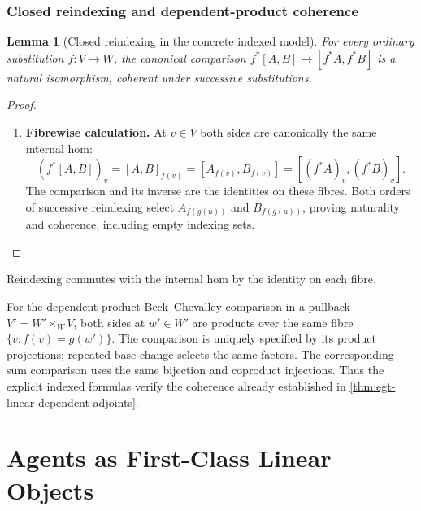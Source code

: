 \documentclass[11pt,a4paper]{article}
\numberwithin{equation}{section}
\newtheorem{lemma}[theorem]{Lemma}
\theoremstyle{definition}
\theoremstyle{remark}
\theoremstyle{plain}
\begin{document}
\subsubsection{Closed reindexing and dependent-product coherence}

\begin{lemma}[Closed reindexing in the concrete indexed model]
\label{agt-lem-closed-reindexing}
For every ordinary substitution $f:V\to W$, the canonical comparison
$f^*[A,B]\to[f^*A,f^*B]$ is a natural isomorphism, coherent under
successive substitutions.
\end{lemma}
\begin{proof}
\leavevmode
\begin{enumerate}[label=\textup{(\arabic*)},leftmargin=*,itemsep=4pt,topsep=3pt]
  \item \textbf{Fibrewise calculation.} At $v\in V$ both sides are canonically the same internal hom:
\[
 (f^*[A,B])_v=[A,B]_{f(v)}
 =[A_{f(v)},B_{f(v)}]
 =[(f^*A)_v,(f^*B)_v].
\]
The comparison and its inverse are the identities on these fibres. Both orders of successive reindexing select $A_{f(g(u))}$ and
$B_{f(g(u))}$, proving naturality and coherence, including empty
indexing sets. 
\end{enumerate}
\end{proof}

\noindent Reindexing commutes with the internal hom by the identity on each fibre.
\begin{center}
\end{center}

For the dependent-product Beck--Chevalley comparison in a pullback
$V'=W'\times_WV$, both sides at $w'\in W'$ are products over the
same fibre $\{v:f(v)=g(w')\}$. The comparison is uniquely specified by
its product projections; repeated base change selects the same factors.
The corresponding sum comparison uses the same bijection and coproduct
injections. Thus the explicit indexed formulas verify the coherence
already established in \cref{thm:egt-linear-dependent-adjoints}.

\section{Agents as First-Class Linear Objects}\label{sec:paper-2}
\end{document}
